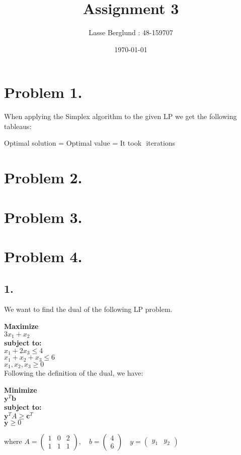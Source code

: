 \documentclass[12pt]{report}
\title{Assignment 3}
\author{Lasse Berglund : 48-159707}
\date{\today}
\begin{document}
\maketitle
\section*{Problem 1.}

When applying the Simplex algorithm to the given LP we get the following tableaus:


Optimal solution = 
Optimal value = 
It took $ $ iterations


\section*{Problem 2.}

\section*{Problem 3.}

\section*{Problem 4.}

\subsection*{1.}

We want to find the dual of the following LP problem.

\textbf{Maximize}\\
  $3x_1 + x_2$\\
\textbf{subject to:}\\
  $ x_1 + 2x_3 \le 4 $ \\
  $ x_1 + x_2 + x_3\le 6 $ \\
  $ x_1,x_2,x_3 \ge 0 $ \\

Following the definition of the dual, we have:

\textbf{Minimize}\\
  $\textbf{y}^T \textbf{b} $\\
\textbf{subject to:}\\
  $ \textbf{y}^T A \ge \textbf{c}^T $ \\
  $ \textbf{y} \ge 0 $ 

where $A = \left(
\begin{matrix}
  1 & 0 & 2 \\
  1 & 1 & 1 
\end{matrix}
\right),
\quad 
b = \left(
\begin{matrix}
  4 \\
  6 
\end{matrix}
\right)
\quad 
y = \left(
\begin{matrix}
  y_1 & y_2  
\end{matrix}
\right) $ 
\end{document}
